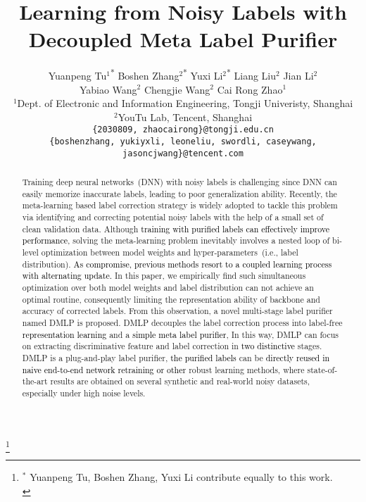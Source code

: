\documentclass[10pt,twocolumn,letterpaper]{article}
\newcommand{\lyx}[1]{\textcolor{black}{#1}}
\begin{document}
\title{Learning from Noisy Labels with Decoupled Meta Label Purifier}







\author{Yuanpeng Tu$^{1}$\textsuperscript{*} \quad Boshen Zhang$^{2}$\textsuperscript{*} \quad Yuxi Li$^{2}$\textsuperscript{*} \quad Liang Liu$^{2}$ \quad Jian Li$^{2}$ \\ Yabiao Wang$^{2}$ \quad  Chengjie Wang$^{2}$ \quad Cai Rong Zhao$^{1}$\\
	$^{1}$Dept. of Electronic and Information Engineering, Tongji Univeristy, Shanghai \\ $^{2}$YouTu Lab, Tencent, Shanghai \\
{\tt\small \{2030809, zhaocairong\}@tongji.edu.cn}\\
	{\tt\small \{boshenzhang, yukiyxli, leoneliu, swordli, caseywang, jasoncjwang\}@tencent.com}}


\maketitle

\footnote{$^{*}$ Yuanpeng Tu, Boshen Zhang, Yuxi Li contribute equally to this work.\\}



\newcommand{\fix}{\marginpar{FIX}}
\newcommand{\new}{\marginpar{NEW}}





\begin{abstract}
Training deep neural networks~(DNN) with noisy labels is challenging since DNN can easily memorize inaccurate labels, leading to poor generalization ability. Recently, the meta-learning based label correction strategy is widely adopted to tackle this problem via identifying and correcting potential noisy labels with the help of a small set of clean validation data. Although \lyx{training with purified labels can effectively improve performance}, solving the meta-learning problem inevitably involves a nested loop of bi-level optimization between model weights and hyper-parameters~(i.e., label distribution). \lyx{As compromise, previous methods resort to a coupled learning process with alternating update.} In this paper, we empirically find such simultaneous optimization over both model weights and label distribution can not achieve an optimal routine, consequently limiting the representation ability of backbone and accuracy of corrected labels. From this observation, a novel multi-stage label purifier named DMLP is proposed. DMLP decouples the label correction process into label-free \lyx{representation learning} and a \lyx{simple meta label purifier}, In this way, DMLP can focus on extracting discriminative feature and label correction in \lyx{two distinctive} stages. DMLP is a plug-and-play label purifier, \lyx{the purified labels} can be \lyx{directly reused in naive end-to-end network retraining or other} robust learning methods, where state-of-the-art results are obtained on several synthetic and real-world noisy datasets, especially under high noise levels.
\end{abstract}
\end{document}
